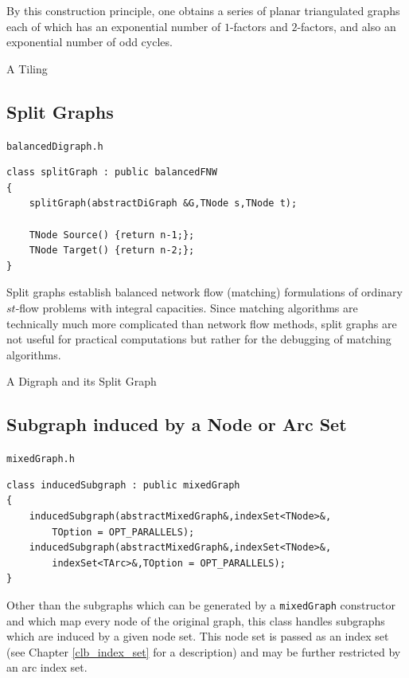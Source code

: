\documentclass[a4paper,11pt,twoside]{book}
\begin{document}
\begin{multicols}{2}
By this construction principle, one obtains a series of planar triangulated graphs
each of which has an exponential number of $1$-factors and $2$-factors, and also an
exponential number of odd cycles.

\bigskip
\begin{figurehere}
\begin{center}
\epsfxsize=11cm
\vspace{0.5cm}
\caption{\label{flb_tiling}A Tiling}
\end{center}
\end{figurehere}


\subsection{Split Graphs}
\label{slb_split_graph}
\myinclude\verb/balancedDigraph.h/
\begin{mymethods}
\begin{verbatim}
class splitGraph : public balancedFNW
{
    splitGraph(abstractDiGraph &G,TNode s,TNode t);

    TNode Source() {return n-1;};
    TNode Target() {return n-2;};
}
\end{verbatim}
\end{mymethods}
Split graphs establish balanced network flow (matching) formulations of
ordinary $st$-flow problems with integral capacities. Since matching algorithms
are technically much more complicated than network flow methods, split graphs
are not useful for practical computations but rather for the debugging of
matching algorithms.

\bigskip
\begin{figurehere}
\begin{center}
\epsfxsize=3.5cm
\epsfxsize=7cm
\hspace*{1cm}
\vspace{0.5cm}
\caption{\label{flb_splitgraph}A Digraph and its Split Graph}
\end{center}
\end{figurehere}


\subsection{Subgraph induced by a Node or Arc Set}
\label{sbl_induced_subgraph}
\myinclude\verb/mixedGraph.h/
\begin{mymethods}
\begin{verbatim}
class inducedSubgraph : public mixedGraph
{
    inducedSubgraph(abstractMixedGraph&,indexSet<TNode>&,
        TOption = OPT_PARALLELS);
    inducedSubgraph(abstractMixedGraph&,indexSet<TNode>&,
        indexSet<TArc>&,TOption = OPT_PARALLELS);
}
\end{verbatim}
\end{mymethods}
Other than the subgraphs which can be generated by a \verb/mixedGraph/
constructor and which map every node of the original graph, this class handles
subgraphs which are induced by a given node set. This node set is passed as an
index set (see Chapter \ref{clb_index_set} for a description) and may be 
further restricted by an arc index set.


\end{multicols}
\end{document}
